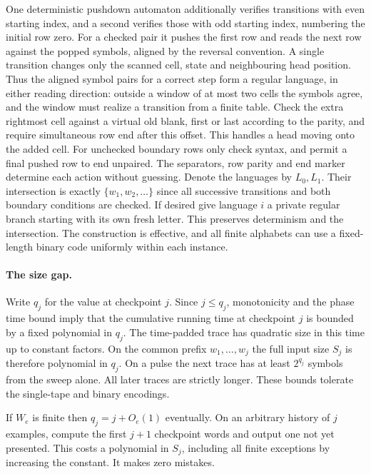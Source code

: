 \documentclass[11pt]{article}
\begin{document}
One deterministic pushdown automaton additionally verifies transitions with even starting index, and a second verifies those with odd starting index, numbering the initial row zero. For a checked pair it pushes the first row and reads the next row against the popped symbols, aligned by the reversal convention. A single transition changes only the scanned cell, state and neighbouring head position. Thus the aligned symbol pairs for a correct step form a regular language, in either reading direction: outside a window of at most two cells the symbols agree, and the window must realize a transition from a finite table. Check the extra rightmost cell against a virtual old blank, first or last according to the parity, and require simultaneous row end after this offset. This handles a head moving onto the added cell. For unchecked boundary rows only check syntax, and permit a final pushed row to end unpaired. The separators, row parity and end marker determine each action without guessing. Denote the languages by $L_0,L_1$. Their intersection is exactly $\{w_1,w_2,\ldots\}$ since all successive transitions and both boundary conditions are checked. If desired give language $i$ a private regular branch starting with its own fresh letter. This preserves determinism and the intersection. The construction is effective, and all finite alphabets can use a fixed-length binary code uniformly within each instance.

\paragraph{The size gap.} Write $q_j$ for the value at checkpoint $j$. Since $j\le q_j$, monotonicity and the phase time bound imply that the cumulative running time at checkpoint $j$ is bounded by a fixed polynomial in $q_j$. The time-padded trace has quadratic size in this time up to constant factors. On the common prefix $w_1,\ldots,w_j$ the full input size $S_j$ is therefore polynomial in $q_j$. On a pulse the next trace has at least $2^{q_j}$ symbols from the sweep alone. All later traces are strictly longer. These bounds tolerate the single-tape and binary encodings.

If $W_e$ is finite then $q_j=j+O_e(1)$ eventually. On an arbitrary history of $j$ examples, compute the first $j+1$ checkpoint words and output one not yet presented. This costs a polynomial in $S_j$, including all finite exceptions by increasing the constant. It makes zero mistakes.
\end{document}
